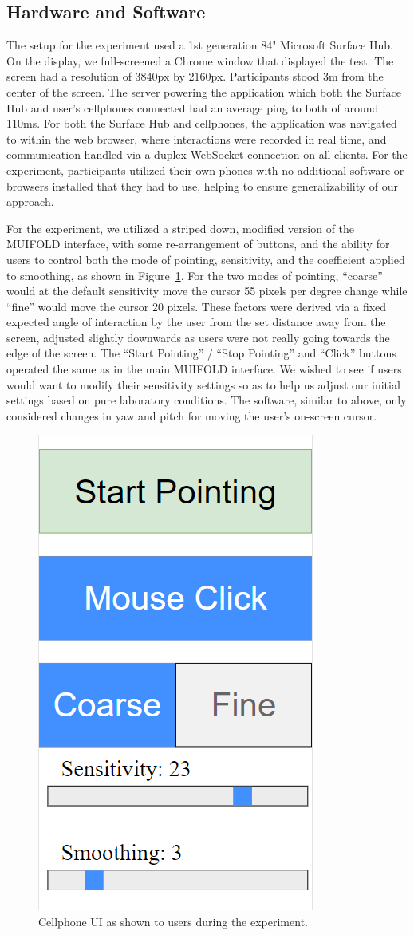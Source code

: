 \subsection{Hardware and Software}

The setup for the experiment used a 1st generation 84" Microsoft Surface Hub. On
the display, we full-screened a Chrome window that displayed the test. The screen
had a resolution of 3840px by 2160px. Participants stood 3m from the center
of the screen. The server powering the application which
both the Surface Hub and user's cellphones connected had an average ping to both
of around 110ms. For both the Surface Hub and cellphones, the application was
navigated to within the web browser, where interactions were recorded in
real time, and communication handled via a duplex WebSocket connection on all
clients. For the experiment, participants utilized their own phones with no
additional software or browsers installed that they had to use, helping to ensure
generalizability of our approach.

For the experiment, we utilized a striped down, modified version of the MUIFOLD
interface, with some re-arrangement of buttons, and the ability for users to
control both the mode of pointing, sensitivity, and the coefficient applied to
smoothing, as shown in Figure~\ref{fig:experiment_ui}.
For the two modes of pointing, ``coarse'' would at the default
sensitivity move the cursor 55 pixels per degree change while ``fine'' would
move the cursor 20 pixels. These factors were derived via a fixed expected
angle of interaction by the user from the set distance away from the screen,
adjusted slightly downwards as users were not really going towards the edge
of the screen. The ``Start Pointing'' / ``Stop Pointing'' and
``Click'' buttons operated the same as in the main MUIFOLD interface. We wished
to see if users would want to modify their sensitivity settings so as to help
us adjust our initial settings based on pure laboratory conditions. The software,
similar to above, only considered changes in yaw and pitch for moving the
user's on-screen cursor.

\begin{figure}
\centering
  \includegraphics[width=0.4\columnwidth]{chapters/04_muifold/figures/experiment_ui.png}
  \caption{Cellphone UI as shown to users during the experiment.}
  \label{fig:experiment_ui}
\end{figure}
